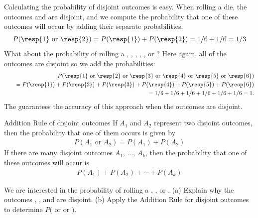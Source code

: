 Calculating the probability of disjoint outcomes is easy. When rolling a die, the outcomes  and  are disjoint, and we compute the probability that one of these outcomes will occur by adding their separate probabilities:
\begin{eqnarray*}
P(\text{\resp{1} or \resp{2}}) = P(\text{\resp{1}})+P(\text{\resp{2}}) = 1/6 + 1/6 = 1/3
\end{eqnarray*}
What about  the probability of rolling a , , , , , or ? Here again, all of the outcomes are disjoint so we add the probabilities:
\begin{eqnarray*}
&&P(\text{\resp{1} or \resp{2} or \resp{3} or \resp{4} or \resp{5} or \resp{6}}) \\
	&&\quad= P(\text{\resp{1}})+P(\text{\resp{2}})+P(\text{\resp{3}})+P(\text{\resp{4}})+P(\text{\resp{5}})+P(\text{\resp{6}}) \\
	&&\quad= 1/6 + 1/6 + 1/6 + 1/6 + 1/6 + 1/6 = 1.
\end{eqnarray*}
The  guarantees the accuracy of this approach when the outcomes are disjoint. 

\begin{onebox}{Addition Rule of disjoint outcomes}
  If $A_1$ and $A_2$ represent two disjoint outcomes,
  then the probability that one of them occurs is given by
  \begin{align*}
  P(A_1\text{ or } A_2) = P(A_1) + P(A_2)
  \end{align*}
  If there are many disjoint outcomes $A_1$, ..., $A_k$,
  then the probability that one of these outcomes will occur is
  \begin{align*}
  P(A_1) + P(A_2) + \cdots + P(A_k)
  \end{align*}
\end{onebox}

\begin{exercisewrap}
\begin{nexercise}
We are interested in the probability of rolling a , , or . (a) Explain why the outcomes , , and  are disjoint. (b) Apply the Addition Rule for disjoint outcomes to determine $P($ or  or $)$.\footnotemark
\end{nexercise}
\end{exercisewrap}

